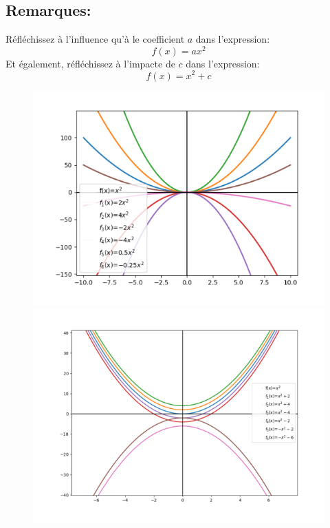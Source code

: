 \documentclass[11pt, french]{article}
\begin{document}
\subsection*{Remarques:}
Réfléchissez à l'influence qu'à le coefficient $a$ dans l'expression:
\begin{equation*}
    f(x) = ax^2
\end{equation*}
Et également, réfléchissez à l'impacte de $c$ dans l'expression:
\begin{equation*}
    f(x) = x^2+c
\end{equation*}

\begin{figure}[!h]
\center
\includegraphics[scale=1]{assets/serie_4_exo_1_figure_3.png}
\includegraphics[scale=1]{assets/serie_4_exo_1_figure_4.png}
\label{fig:p_s_4_exo1-fig1+2}
\end{figure}
\end{document}

